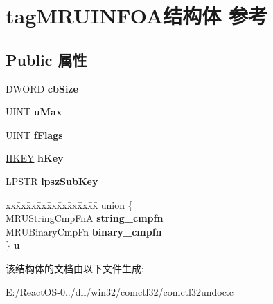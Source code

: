 \hypertarget{structtag_m_r_u_i_n_f_o_a}{}\section{tag\+M\+R\+U\+I\+N\+F\+O\+A结构体 参考}
\label{structtag_m_r_u_i_n_f_o_a}
\subsection*{Public 属性}
\begin{DoxyCompactItemize}
\item 
\mbox{\label{structtag_m_r_u_i_n_f_o_a_a4dbea29c1d57b69f1a01e7468dd3d390}} 
D\+W\+O\+RD {\bfseries cb\+Size}
\item 
\mbox{\label{structtag_m_r_u_i_n_f_o_a_ac7a85d72fcef4adb68009578e916add8}} 
U\+I\+NT {\bfseries u\+Max}
\item 
\mbox{\label{structtag_m_r_u_i_n_f_o_a_aa60dbe16e21df288be0c954a927d4afd}} 
U\+I\+NT {\bfseries f\+Flags}
\item 
\mbox{\label{structtag_m_r_u_i_n_f_o_a_af0293a5a9117bebc3d28ee1c2a0c79e7}} 
\hyperlink{interfacevoid}{H\+K\+EY} {\bfseries h\+Key}
\item 
\mbox{\label{structtag_m_r_u_i_n_f_o_a_a13ee07a23906b765aea5ec1f72a15d6a}} 
L\+P\+S\+TR {\bfseries lpsz\+Sub\+Key}
\item 
\mbox{\label{structtag_m_r_u_i_n_f_o_a_a2e10b3bb32a54f5fca7e70aafaa4e2dd}} 
\begin{tabbing}
xx\=xx\=xx\=xx\=xx\=xx\=xx\=xx\=xx\=\kill
union \{\\
\>MRUStringCmpFnA {\bfseries string\_cmpfn}\\
\>MRUBinaryCmpFn {\bfseries binary\_cmpfn}\\
\} {\bfseries u}\\

\end{tabbing}\end{DoxyCompactItemize}


该结构体的文档由以下文件生成\+:\begin{DoxyCompactItemize}
\item 
E\+:/\+React\+O\+S-\/0../dll/win32/comctl32/comctl32undoc.\+c\end{DoxyCompactItemize}
